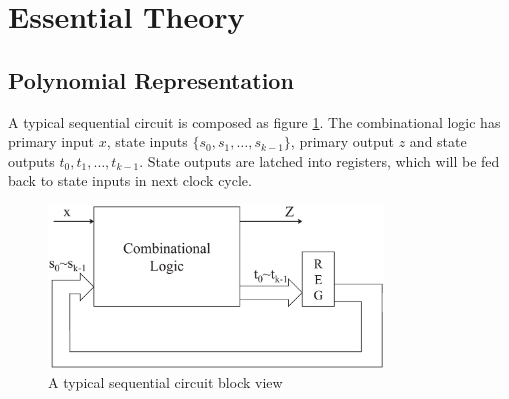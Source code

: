 
\section{Essential Theory}
\subsection{Polynomial Representation}
A typical sequential circuit is composed as figure \ref{fig:sequential}. The combinational logic has primary input $x$, state
inputs $\{s_0, s_1, \dots, s_{k-1}\}$, primary output $z$ and state outputs $t_0, t_1, \dots, t_{k-1}$. State outputs
are latched into registers, which will be fed back to state inputs in next clock cycle.

\begin{figure}[hbt]
\begin{center}
\includegraphics[width=3.5in]{./sequential_fig.eps}
\end{center}
\caption{A typical sequential circuit block view}
\label{fig:sequential}
\end{figure}


